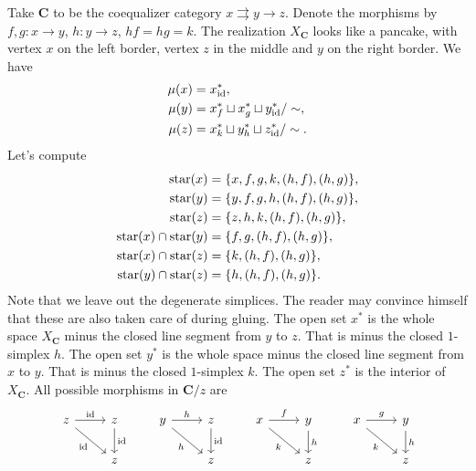 \begin{example}
\label{ex:ST of the coequalizer category}
Take $\mathbf{C}$ to be the coequalizer category $x \rightrightarrows y \to z$. Denote the morphisms by $f,g : x \to y$, $h : y \to z$, $hf = hg = k$. The realization $X_\mathbf{C}$ looks like a pancake, with vertex $x$ on the left border, vertex $z$ in the middle and $y$ on the right border. We have
\begin{align*}
\operatorname{\mu}(x) &= x^*_{\operatorname{id}}, \\
\operatorname{\mu}(y) &= x^*_f \sqcup x^*_g \sqcup y^*_{\operatorname{id}} / \sim, \\
\operatorname{\mu}(z) &= x^*_k \sqcup y^*_h \sqcup z^*_{\operatorname{id}} / \sim.
\end{align*}
Let's compute
\begin{align*}
\operatorname{star}(x) &= \{x,f,g,k,(h,f),(h,g)\}, \\
\operatorname{star}(y) &= \{y,f,g,h,(h,f),(h,g)\}, \\
\operatorname{star}(z) &= \{z,h,k,(h,f),(h,g)\}, \\
\operatorname{star}(x) \cap \operatorname{star}(y) &= \{f,g,(h,f),(h,g)\}, \\
\operatorname{star}(x) \cap \operatorname{star}(z) &= \{k,(h,f),(h,g)\}, \\
\operatorname{star}(y) \cap \operatorname{star}(z) &= \{h,(h,f),(h,g)\}.
\end{align*}
Note that we leave out the degenerate simplices. 
The reader may convince himself that these are also taken care of during gluing.
The open set $x^*$ is the whole space $X_\mathbf{C}$ minus the closed line segment from $y$ to $z$. That is minus the closed $1$-simplex $h$. The open set $y^*$ is the whole space minus the closed line segment from $x$ to $y$. That is minus the closed $1$-simplex $k$. The open set $z^*$ is the interior of $X_\mathbf{C}$.
All possible morphisms in $\mathbf{C}/z$ are
\[ \begin{tikzcd}
z \arrow{r}{\id} \arrow[swap]{dr}{\id} & z \arrow{d}{\id} & y \arrow{r}{h} \arrow[swap]{dr}{h} & z \arrow{d}{\id} & x \arrow{r}{f} \arrow[swap]{dr}{k} & y \arrow{d}{h} & x \arrow{r}{g} \arrow[swap]{dr}{k} & y \arrow{d}{h} \\
& z & & z & & z & & z
\end{tikzcd} \]


\end{example}
